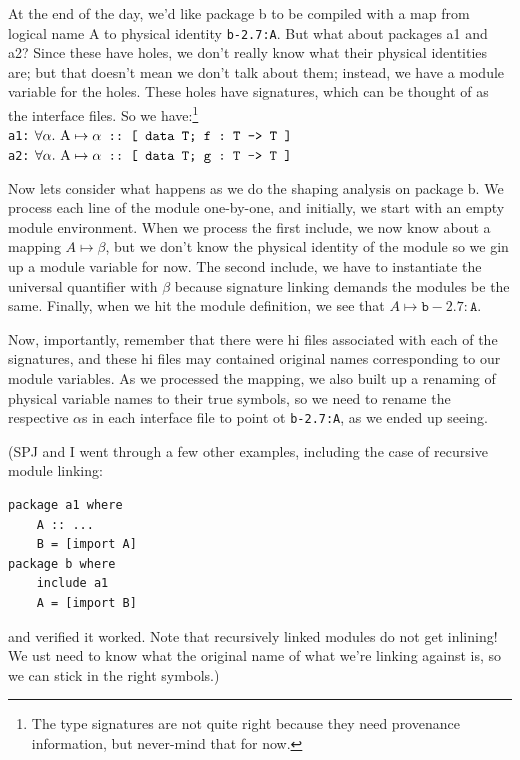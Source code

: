 \documentclass{article}
\begin{document}
At the end of the day, we'd like package b to be compiled with a map from
logical name A to physical identity \verb|b-2.7:A|. But what about packages
a1 and a2?  Since these have holes, we don't really know what their physical
identities are; but that doesn't mean we don't talk about them; instead,
we have a module variable for the holes.  These holes have signatures, which can be thought
of as the interface files.  So we have:\footnote{The type signatures are not quite right because they need provenance information, but never-mind that for now.} \\

\noindent
\verb|a1:| $\forall \alpha.\ \mathrm{A} \mapsto \alpha \mbox{\texttt{\ ::\ [ data T\@; f :\ T -> T ]}}$ \\ %
\verb|a2:| $\forall \alpha.\ \mathrm{A} \mapsto \alpha \mbox{\texttt{\ ::\ [ data T\@; g :\ T -> T ]}}$ %

Now lets consider what happens as we do the shaping analysis on package b.
We process each line of the module one-by-one, and initially, we start
with an empty module environment.  When we process the first include, we
now know about a mapping $A \mapsto \beta$, but we don't know the physical
identity of the module so we gin up a module variable for now.  The second
include, we have to instantiate the universal quantifier with $\beta$ because
signature linking demands the modules be the same. Finally, when we hit the
module definition, we see that $A \mapsto \mathtt{b-2.7:A}$.

Now, importantly, remember that there were hi files associated with each
of the signatures, and these hi files may contained original names
corresponding to our module variables.  As we processed the mapping, we
also built up a renaming of physical variable names to their true
symbols, so we need to rename the respective $\alpha$s in each interface
file to point ot \texttt{b-2.7:A}, as we ended up seeing.

(SPJ and I went through a few other examples, including the case of recursive
module linking:

\begin{verbatim}
package a1 where
    A :: ...
    B = [import A]
package b where
    include a1
    A = [import B]
\end{verbatim}

and verified it worked.  Note that recursively linked modules do not get
inlining! We ust need to know what the original name of what we're linking
against is, so we can stick in the right symbols.)
\end{document}
